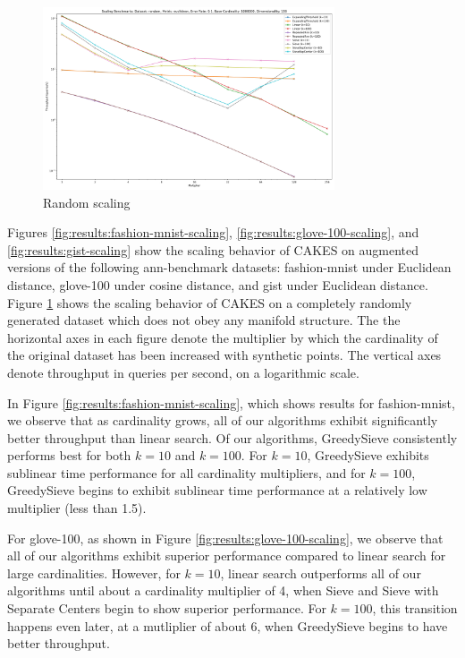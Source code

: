 \begin{figure}[ht!]
    \centering
    \includegraphics[width=3.4in]{images/result_plots/random_0.1_scaling.png}
    \caption{
        Random scaling
    }
    \label{fig:results:random-scaling}
\end{figure}

Figures \ref{fig:results:fashion-mnist-scaling}, \ref{fig:results:glove-100-scaling}, and \ref{fig:results:gist-scaling} show the scaling behavior of CAKES on augmented versions of the following ann-benchmark datasets: fashion-mnist under Euclidean distance, glove-100 under cosine distance, and gist under Euclidean distance. 
Figure \ref{fig:results:random-scaling} shows the scaling behavior of CAKES on a completely randomly generated dataset which does not obey any manifold structure. 
The the horizontal axes in each figure denote the multiplier by which the cardinality of the original dataset has been increased with synthetic points. The vertical axes denote throughput in queries per second, on a logarithmic scale. 


In Figure \ref{fig:results:fashion-mnist-scaling}, which shows results for fashion-mnist, we observe that as cardinality grows, all of our algorithms exhibit significantly better throughput than linear search. 
Of our algorithms, GreedySieve consistently performs best for both $k=10$ and $k=100$. For $k=10$, GreedySieve exhibits sublinear time performance for all cardinality multipliers, and for $k = 100$, GreedySieve begins to exhibit sublinear time performance at a relatively low multiplier (less than 1.5).  


For glove-100, as shown in Figure \ref{fig:results:glove-100-scaling}, we observe that all of our algorithms exhibit superior performance compared to linear search for large cardinalities. However, for $k=10$, linear search outperforms all of our algorithms until about a cardinality multiplier of 4, when Sieve and Sieve with Separate Centers begin to show superior performance. For $k=100$, this transition happens even later, at a mutliplier of about 6, when GreedySieve begins to have better throughput. 

